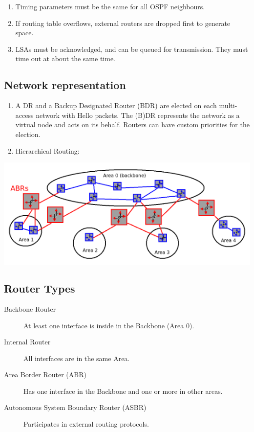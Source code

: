 \documentclass{article}
\begin{document}
\begin{enumerate}
	\item Timing parameters must be the same for all OSPF neighbours.
	\item If routing table overflows, external routers are dropped first to generate space.
	\item LSAs must be acknowledged, and can be queued for transmission. They must time out at about the same time.
\end{enumerate}





\subsection{Network representation}
	
\begin{enumerate}
	\item A DR and a Backup Designated Router (BDR) are elected on each multi-access network with Hello packets. The (B)DR represents the network as a virtual node and acts on its behalf. Routers can have custom priorities for the election.
	\item Hierarchical Routing:
\end{enumerate}


\centerline{\includegraphics[scale=0.5]{images/OSPF.png}\\[1cm]}


\subsection{Router Types}
	
\begin{description}
	\item[Backbone Router] At least one interface is inside in the Backbone (Area 0).
	\item[Internal Router] All interfaces are in the same Area.
	\item[Area Border Router (ABR)] Has one interface in the Backbone and one or more in other areas.
	\item[Autonomous System Boundary Router (ASBR)] Participates in external routing protocols.
\end{description}
\end{document}
